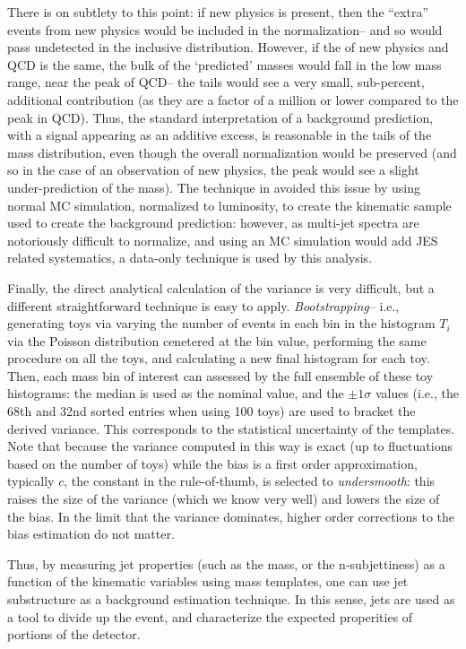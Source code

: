 There is on subtlety to this point: if new physics is present, then the ``extra'' events from new physics would be included in the normalization-- and so would pass undetected in the inclusive distribution. However, if the \pt of new physics and QCD is the same, the bulk of the `predicted' masses would fall in the low mass range, near the peak of QCD-- the tails would see a very small, sub-percent, additional contribution (as they are a factor of a million or lower compared to the peak in QCD). Thus, the standard interpretation of a background prediction, with a signal appearing as an additive excess, is reasonable in the tails of the mass distribution, even though the overall normalization would be preserved (and so in the case of an observation of new physics, the peak would see a slight under-prediction of the mass). The technique in \cite{MassTemplates} avoided this issue by using normal MC simulation, normalized to luminosity, to create the kinematic sample used to create the background prediction: however, as multi-jet \pt spectra are notoriously difficult to normalize, and using an MC simulation would add JES related systematics, a data-only technique is used by this analysis.

Finally, the direct analytical calculation of the variance is very difficult, but a different straightforward technique is easy to apply. \textit{Bootstrapping}-- i.e., generating toys via varying the number of events in each bin in the histogram $T_i$ via the Poisson distribution cenetered at the bin value, performing the same procedure on all the toys, and calculating a new final histogram for each toy. Then, each mass bin of interest can assessed by the full ensemble of these toy histograms: the median is used as the nominal value, and the $\pm 1\sigma$ values (i.e., the 68th and 32nd sorted entries when using 100 toys) are used to bracket the derived variance. This corresponds to the statistical uncertainty of the templates. Note that because the variance computed in this way is exact (up to fluctuations based on the number of toys) while the bias is a first order approximation, typically $c$, the constant in the rule-of-thumb, is selected to \textit{undersmooth}: this raises the size of the variance (which we know very well) and lowers the size of the bias. In the limit that the variance dominates, higher order corrections to the bias estimation do not matter.

Thus, by measuring jet properties (such as the mass, or the n-subjettiness) as a function of the kinematic variables using mass templates, one can use jet substructure as a background estimation technique. In this sense, jets are used as a tool to divide up the event, and characterize the expected properities of portions of the detector.
%

